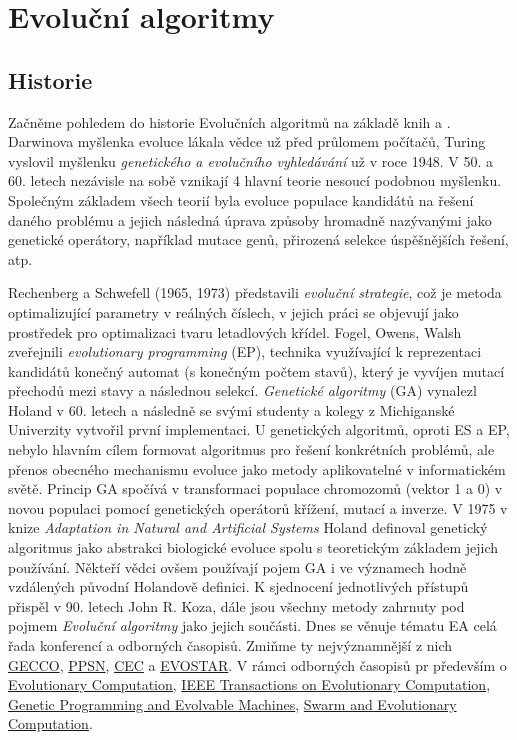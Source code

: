 \chapter{Evoluční algoritmy}
\section{Historie}
Začněme pohledem do historie Evolučních algoritmů na základě knih \cite{MitchellBook} a \cite{eibenIntro}. Darwinova myšlenka evoluce lákala vědce už před průlomem počítačů, Turing vyslovil myšlenku \textit{genetického a evolučního vyhledávání} už v roce 1948. V 50. a 60. letech nezávisle na sobě vznikají 4 hlavní teorie nesoucí podobnou myšlenku. Společným základem všech teorií byla evoluce populace kandidátů na řešení daného problému a jejich následná úprava způsoby hromadně nazývanými jako genetické operátory, například mutace genů, přirozená selekce úspěšnějších řešení, atp.
\par 
Rechenberg a Schwefell (1965, 1973) představili \textit{evoluční strategie}, což je metoda optimalizující parametry v reálných číslech, v jejich práci se objevují jako prostředek pro optimalizaci tvaru letadlových křídel. Fogel, Owens, Walsh zveřejnili \textit{evolutionary programming} (EP), technika využívající k reprezentaci kandidátů konečný automat (s konečným počtem stavů), který je vyvíjen mutací přechodů mezi stavy a následnou selekcí. \textit{Genetické algoritmy} (GA) vynalezl Holand v 60. letech a následně se svými studenty a kolegy z Michiganské Univerzity vytvořil první implementaci. U genetických algoritmů, oproti ES a EP, nebylo hlavním cílem formovat algoritmus pro řešení konkrétních problémů, ale přenos obecného mechanismu evoluce jako metody aplikovatelné v informatickém světě. Princip GA spočívá v transformaci populace chromozomů (vektor 1 a 0) v novou populaci pomocí genetických operátorů křížení, mutací a inverze. V 1975 v knize \textit{Adaptation in Natural and  Artificial Systems} \citep{HolandBook} Holand definoval genetický algoritmus jako abstrakci biologické evoluce spolu s teoretickým základem jejich používání. Někteří vědci ovšem používají pojem GA i ve významech hodně vzdálených původní Holandově definici. K sjednocení jednotlivých přístupů přispěl v 90. letech John R. Koza, dále jsou všechny metody zahrnuty pod pojmem \textit{Evoluční algoritmy} jako jejich součásti. Dnes se věnuje tématu EA celá řada konferencí a odborných časopisů. Zmiňme ty nejvýznamnější z nich  
\href{http://gecco-2017.sigevo.org/index.html/HomePage}{GECCO}, \href{http://www.ppsn2016.org/conference}{PPSN}, 
\href{http://www.cec2017.org/}{CEC} a 
\href{http://www.evostar.org/2018/}{EVOSTAR}.
V rámci odborných časopisů pr především o \href{http://www.mitpressjournals.org/loi/evco}{Evolutionary Computation}, 
\href{http://ieeexplore.ieee.org/xpl/RecentIssue.jsp?reload=true&punumber=4235}{IEEE Transactions on Evolutionary Computation}, 
\href{http://www.springer.com/computer/ai/journal/10710}{Genetic Programming and Evolvable Machines},
\href{https://www.journals.elsevier.com/swarm-and-evolutionary-computation/}{Swarm and Evolutionary Computation}.

